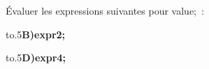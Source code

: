 \documentclass[exercice]{thedocument}%
\begin{document}
%
Évaluer les expressions suivantes pour  \<value;~:\par\medskip\noindent
\hbox{\hbox to.5\hbox{{\bfseries B)\quad \<expr2;}}}\par\smallskip
\hbox{\hbox to.5\hbox{{\bfseries D)\quad \<expr4;}}}
\end{document}
